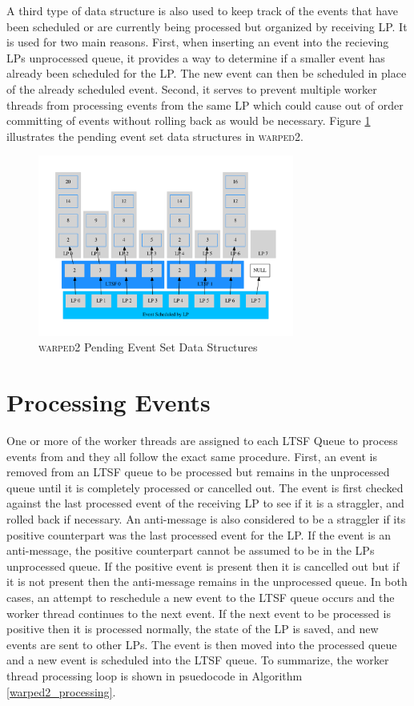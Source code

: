 \documentclass[11pt]{book}
\begin{document}
A third type of data structure is also used to keep track of the events that have been scheduled or
are currently being processed but organized by receiving LP.  It is used for two main reasons.
First, when inserting an event into the recieving LPs unprocessed queue, it provides a way to
determine if a smaller event has already been scheduled for the LP.  The new event can then be
scheduled in place of the already scheduled event.  Second, it serves to prevent multiple worker
threads from processing events from the same LP which could cause out of order committing of events
without rolling back as would be necessary.  Figure \ref{pending_event_set} illustrates the pending
event set data structures in \textsc{warped2}.

\begin{figure}
    \centering
    \includegraphics[width=0.75\textwidth,quiet]{figs/graphviz/pending_event_set.pdf}
    \caption{\textsc{warped2} Pending Event Set Data Structures}\label{pending_event_set}
\end{figure}

\section{Processing Events}

One or more of the worker threads are assigned to each LTSF Queue to process events from and they
all follow the exact same procedure.  First, an event is removed from an LTSF queue to be processed
but remains in the unprocessed queue until it is completely processed or cancelled out.  The event
is first checked against the last processed event of the receiving LP to see if it is a straggler,
and rolled back if necessary.  An anti-message is also considered to be a straggler if its positive
counterpart was the last processed event for the LP.  If the event is an anti-message, the positive
counterpart cannot be assumed to be in the LPs unprocessed queue.  If the positive event is present
then it is cancelled out but if it is not present then the anti-message remains in the unprocessed
queue.  In both cases, an attempt to reschedule a new event to the LTSF queue occurs and the worker
thread continues to the next event.  If the next event to be processed is positive then it is
processed normally, the state of the LP is saved, and new events are sent to other LPs.  The event
is then moved into the processed queue and a new event is scheduled into the LTSF queue.  To
summarize, the worker thread processing loop is shown in psuedocode in Algorithm
\ref{warped2_processing}.
\end{document}
